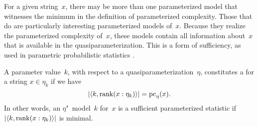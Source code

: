 For a given string~$x$, there may be more than one parameterized model that witnesses the minimum in the definition of parameterized complexity.
Those that do are particularly interesting parameterized models of~$x$.
Because they realize the parameterized complexity of~$x$, these models contain all information about~$x$ that is available in the quasiparameterization.
This is a form of sufficiency, as used in parametric probabilistic statistics \parencite[see also][Section~2.9]{cover2006elements}.
\begin{definition}
  A parameter value~$k$, with respect to a quasiparameterization~$\eta$, constitutes a  for a string $x \in \eta_k$ if we have
  \begin{equation*}
    {\lvert{\langle k, \operatorname{rank}(x : \eta_k)\rangle}\rvert} = \operatorname{pc}_\eta(x).
  \end{equation*}
  In other words, an $\eta$"~model~$k$ for~$x$ is a sufficient parameterized statistic if ${\lvert{\langle k, \operatorname{rank}(x: \eta_k)\rangle}\rvert}$ is minimal.
\end{definition}

